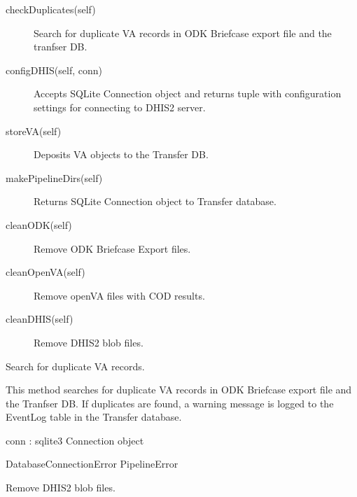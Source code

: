 \documentclass[letterpaper,12pt,english]{sphinxmanual}
\begin{document}
\begin{fulllineitems}
\begin{description}
\item[{checkDuplicates(self)}] \leavevmode
Search for duplicate VA records in ODK Briefcase export file and the
tranfser DB.

\item[{configDHIS(self, conn)}] \leavevmode
Accepts SQLite Connection object and returns tuple with configuration
settings for connecting to DHIS2 server.

\item[{storeVA(self)}] \leavevmode
Deposits VA objects to the Transfer DB.

\item[{makePipelineDirs(self)}] \leavevmode
Returns SQLite Connection object to Transfer database.

\item[{cleanODK(self)}] \leavevmode
Remove ODK Briefcase Export files.

\item[{cleanOpenVA(self)}] \leavevmode
Remove openVA files with COD results.

\item[{cleanDHIS(self)}] \leavevmode
Remove DHIS2 blob files.

\end{description}

\begin{fulllineitems}
\label{\detokenize{help:transferDB.TransferDB.checkDuplicates}}
Search for duplicate VA records.

This method searches for duplicate VA records in ODK Briefcase export
file and the Tranfser DB.  If duplicates are found, a warning message
is logged to the EventLog table in the Transfer database.

conn : sqlite3 Connection object

DatabaseConnectionError
PipelineError

\end{fulllineitems}


\begin{fulllineitems}
\label{\detokenize{help:transferDB.TransferDB.cleanDHIS}}
Remove DHIS2 blob files.

\end{fulllineitems}


\end{fulllineitems}
\end{document}
